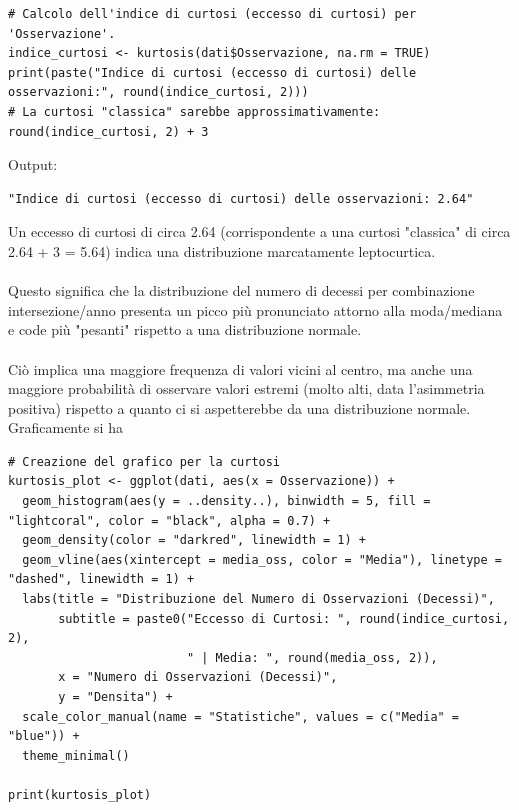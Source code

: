 \documentclass[14pt, openany, titlepage]{report} %
\begin{document}
\begin{center}
\begin{lstlisting}[breaklines=true]
# Calcolo dell'indice di curtosi (eccesso di curtosi) per 'Osservazione'.
indice_curtosi <- kurtosis(dati$Osservazione, na.rm = TRUE)
print(paste("Indice di curtosi (eccesso di curtosi) delle osservazioni:", round(indice_curtosi, 2)))
# La curtosi "classica" sarebbe approssimativamente: round(indice_curtosi, 2) + 3
\end{lstlisting}
\end{center}
\noindent
Output:
\begin{verbatim}
"Indice di curtosi (eccesso di curtosi) delle osservazioni: 2.64" 
\end{verbatim}
Un eccesso di curtosi di circa 2.64 (corrispondente a una curtosi
 "classica" di circa 2.64 + 3 = 5.64) indica una distribuzione 
 marcatamente leptocurtica.\\\\
 \noindent
  Questo significa che la distribuzione 
 del numero di decessi per combinazione intersezione/anno presenta
  un picco più pronunciato attorno alla moda/mediana e code più 
  "pesanti" rispetto a una distribuzione normale. \\\\
  \noindent
  Ciò implica una 
  maggiore frequenza di valori vicini al centro, ma anche una
   maggiore probabilità di osservare valori estremi (molto alti,
    data l'asimmetria positiva) rispetto a quanto ci si aspetterebbe 
    da una distribuzione normale.\\

\noindent
Graficamente si ha
\begin{center}
\begin{lstlisting}[breaklines=true]
# Creazione del grafico per la curtosi
kurtosis_plot <- ggplot(dati, aes(x = Osservazione)) +
  geom_histogram(aes(y = ..density..), binwidth = 5, fill = "lightcoral", color = "black", alpha = 0.7) +
  geom_density(color = "darkred", linewidth = 1) +
  geom_vline(aes(xintercept = media_oss, color = "Media"), linetype = "dashed", linewidth = 1) +
  labs(title = "Distribuzione del Numero di Osservazioni (Decessi)",
       subtitle = paste0("Eccesso di Curtosi: ", round(indice_curtosi, 2),
                         " | Media: ", round(media_oss, 2)),
       x = "Numero di Osservazioni (Decessi)",
       y = "Densita") +
  scale_color_manual(name = "Statistiche", values = c("Media" = "blue")) +
  theme_minimal()

print(kurtosis_plot)
\end{lstlisting}
\end{center}
\end{document}
